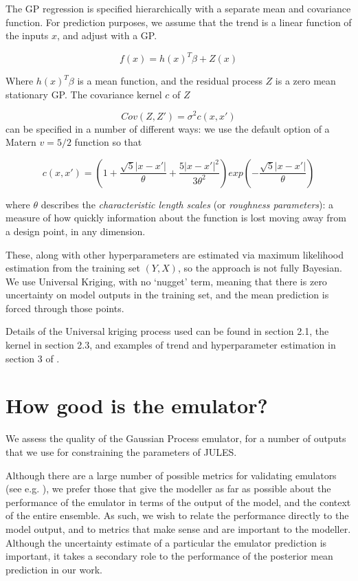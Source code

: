 \documentclass[gmd, manuscript]{copernicus}
\begin{document}
The GP regression is specified hierarchically with a separate mean and covariance function. For prediction purposes, we assume that the trend is a linear function of the inputs $x$, and adjust with a GP. 

$$
f(x) = h(x)^T \beta + Z(x)
$$

Where $h(x)^T \beta$ is a mean function, and the residual process $Z$ is a zero mean stationary GP. The covariance kernel $c$ of $Z$ 

$$
Cov(Z, Z') = \sigma^2 c(x,x')
$$
can be specified in a number of different ways: we use the default option of a Matern $v=5/2$ function so that

$$
c(x,x') = (1 + \frac{\sqrt{5} | x - x'|}{\theta} + \frac{5 | x - x'|^2}{3 \theta^2})exp(- \frac{\sqrt{5} |x-x'|}{\theta})
$$

where $\theta$ describes the \emph{characteristic length scales} (or \emph{roughness parameters}): a measure of how quickly information about the function is lost moving away from a design point, in any dimension. 

These, along with other hyperparameters are estimated via maximum likelihood estimation from the training set $(Y, X)$, so the approach is not fully Bayesian. We use Universal Kriging, with no `nugget' term, meaning that there is zero uncertainty on model outputs in the training set, and the mean prediction is forced through those points. 

Details of the Universal kriging process used can be found in section 2.1, the kernel in section 2.3, and examples of trend and hyperparameter estimation in section 3 of \cite{roustant2012dicekriging}. 


\section{How good is the emulator?}\label{app:emulator_accuracy}    %

We assess the quality of the Gaussian Process emulator, for a number of outputs that we use for constraining the parameters of JULES.

Although there are a large number of possible metrics  for validating emulators (see e.g. \cite{al2018diagnostics}), we prefer those that give the modeller as far as possible about the performance of the emulator in terms of the output of the model, and the context of the entire ensemble. As such, we wish to relate the performance directly to the model output, and to metrics that make sense and are important to the modeller. Although the uncertainty estimate of a particular the emulator prediction is important, it takes a secondary role to the performance of the posterior mean prediction in our work.
\end{document}
